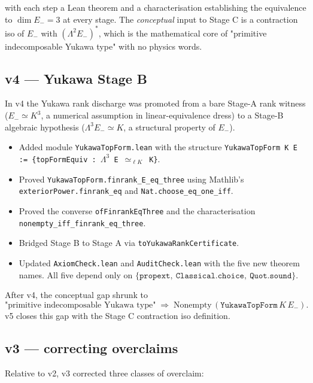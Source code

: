 \documentclass[11pt,a4paper]{article}
\begin{document}
with each step a Lean theorem and a characterisation establishing
the equivalence to $\dim E_- = 3$ at every stage. The
\emph{conceptual} input to Stage C is a contraction iso of $E_-$
with $(\Lambda^2 E_-)^*$, which is the mathematical core of
"primitive indecomposable Yukawa type" with no physics words.

\subsection*{v4 --- Yukawa Stage B}

In v4 the Yukawa rank discharge was promoted from a bare Stage-A
rank witness ($E_- \simeq K^3$, a numerical assumption in
linear-equivalence dress) to a Stage-B algebraic hypothesis
($\Lambda^3 E_- \simeq K$, a structural property of $E_-$).

\begin{itemize}[leftmargin=1.6em, itemsep=2pt]
\item Added module \texttt{YukawaTopForm.lean} with the structure
    \texttt{YukawaTopForm K E := \{topFormEquiv : $\Lambda^3$ E
    $\simeq_{\ell K}$ K\}}.
\item Proved \texttt{YukawaTopForm.finrank\_E\_eq\_three} using
    Mathlib's \texttt{exteriorPower.finrank\_eq} and
    \texttt{Nat.choose\_eq\_one\_iff}.
\item Proved the converse \texttt{ofFinrankEqThree} and the
    characterisation \texttt{nonempty\_iff\_finrank\_eq\_three}.
\item Bridged Stage B to Stage A via
    \texttt{toYukawaRankCertificate}.
\item Updated \texttt{AxiomCheck.lean} and \texttt{AuditCheck.lean}
    with the five new theorem names. All five depend only on
    $\{\texttt{propext},\ \texttt{Classical.choice},\
    \texttt{Quot.sound}\}$.
\end{itemize}

After v4, the conceptual gap shrunk to
\[
\text{"primitive indecomposable Yukawa type"}
\;\Longrightarrow\;
\text{Nonempty}\,(\texttt{YukawaTopForm}\,K\,E_-).
\]
v5 closes this gap with the Stage C contraction iso definition.

\subsection*{v3 --- correcting overclaims}

Relative to v2, v3 corrected three classes of overclaim:
\end{document}
